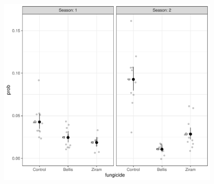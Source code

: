 \documentclass[
  letterpaper,
  DIV=11,
  numbers=noendperiod]{scrartcl}
\begin{document}
\begin{figure}[H]

{\centering \includegraphics{in_field_files/figure-pdf/unnamed-chunk-8-1.pdf}

}

\end{figure}
\end{document}
